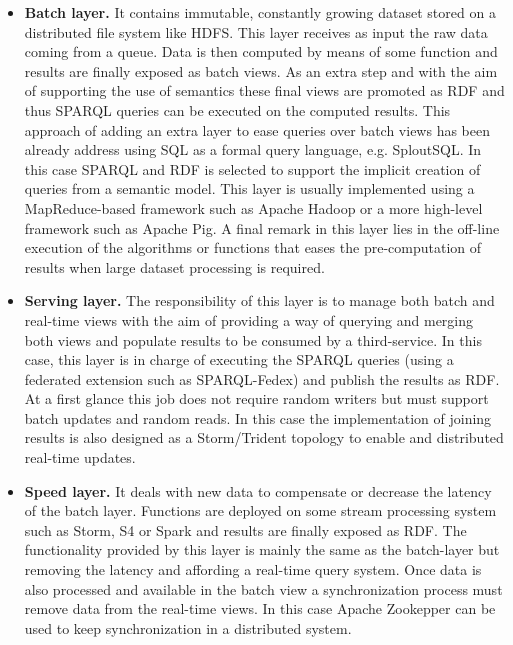\begin{itemize}
 \item \textbf{Batch layer.} It contains immutable, constantly growing dataset stored on a distributed file system like HDFS. This layer 
 receives as input the raw data coming from a queue. Data is then computed by means of some function and results are finally exposed 
 as batch views. As an extra step and with the aim of supporting the use of semantics these final views are promoted as RDF and thus SPARQL queries 
 can be executed on the computed results. This approach of adding an extra layer to ease queries over batch views has been 
 already address using SQL as a formal query language, e.g. SploutSQL. In this case SPARQL and RDF is selected to support the implicit 
 creation of queries from a semantic model. This layer is usually implemented using a MapReduce-based framework such as Apache Hadoop or 
 a more high-level framework such as Apache Pig. A final remark in this layer lies in the off-line execution of the algorithms or functions 
 that eases the pre-computation of results when large dataset processing is required.
 
 \item \textbf{Serving layer.} The responsibility of this layer is to manage both batch and real-time views 
 with the aim of providing a way of querying and merging both views and populate results to be consumed by 
 a third-service. In this case, this layer is in charge of executing the SPARQL queries (using a federated extension 
 such as SPARQL-Fedex) and publish the results as RDF. At a first glance this job does not require 
 random writers but must support batch updates and random reads. In this case the implementation of joining 
 results is also designed as a Storm/Trident topology to enable and distributed real-time updates.

\item \textbf{Speed layer.} It deals with new data to compensate or decrease the latency of the batch layer. 
Functions are deployed on some stream processing system such as Storm, S4 or Spark and results are finally 
exposed as RDF. The functionality provided by this layer is mainly the same as the batch-layer but removing 
the latency and affording a real-time query system. Once data is also processed and available in the batch 
view a synchronization process must remove data from the real-time views. In this case Apache Zookepper 
can be used to keep synchronization in a distributed system.
\end{itemize}

